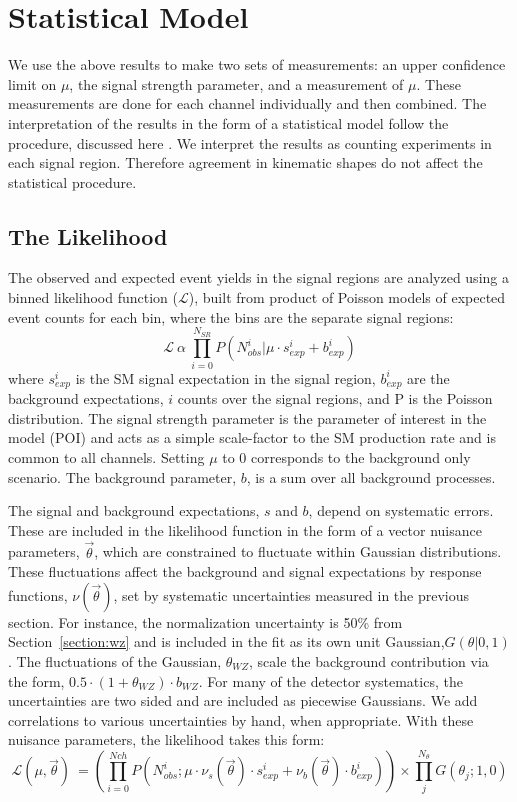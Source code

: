 \section{Statistical Model}

We use the above results to make two sets of measurements: an upper confidence limit on $\mu$, the signal strength parameter, and a measurement of $\mu$. These measurements are done for each channel individually and then combined. The interpretation of the results in the form of a statistical model follow the procedure, discussed here \cite{asym}. We interpret the results as counting experiments in each signal region. Therefore agreement in kinematic shapes do not affect the statistical procedure. 


\subsection{The Likelihood} 
The observed and expected event yields in the signal regions are analyzed using a binned likelihood function ($\mathcal{L}$), built from product of Poisson models of expected event counts for each bin, where the bins are the separate signal regions:
\begin{equation}
\mathcal{L}\ \alpha\  \prod_{i=0}^{N_{SR}} P(N_{obs}^{i}| \mu \cdot s_{exp}^{i} + b_{exp}^{i})
\end{equation}
where $s_{exp}^i$ is the SM signal expectation in the signal region, $b_{exp}^i$ are the background expectations, $i$ counts over the signal regions, and P is the Poisson distribution. The signal strength parameter is the parameter of interest in the model (POI) and acts as a simple scale-factor to the SM \tth production rate and is common to all channels. Setting $\mu$ to 0 corresponds to the background only scenario. The background parameter, $b$, is a sum over all background processes. 

The signal and background expectations, $s$ and $b$, depend on systematic errors. These are included in the likelihood function in the form of a vector nuisance parameters, $\vec{\theta}$, which are constrained to fluctuate within Gaussian distributions. These fluctuations affect the background and signal expectations by response functions, $\nu(\vec{\theta})$, set by systematic uncertainties measured in the previous section. For instance, the \WZ normalization uncertainty is 50\% from Section~\ref{section:wz} and is included in the fit as its own unit Gaussian,$G(\theta|0,1)$. The fluctuations of the Gaussian, $\theta_{WZ}$, scale the background contribution via the form, $0.5\cdot(1+\theta_{WZ})\cdot b_{WZ}$. For many of the detector systematics, the uncertainties are two sided and are included as piecewise Gaussians. We add correlations to various uncertainties by hand, when appropriate. With these nuisance parameters, the likelihood takes this form:
\begin{equation}
\mathcal{L}(\mu,\vec{\theta})\ =  \left( \prod_{i=0}^{N{ch}} P(N_{obs}^{i}; \mu \cdot \nu_{s}(\vec{\theta})\cdot s_{exp}^{i} + \nu_{b}(\vec{\theta})\cdot b_{exp}^{i}) \right) \times \prod_{j}^{N_{\theta}}G(\theta_j; 1,0)
\end{equation}


